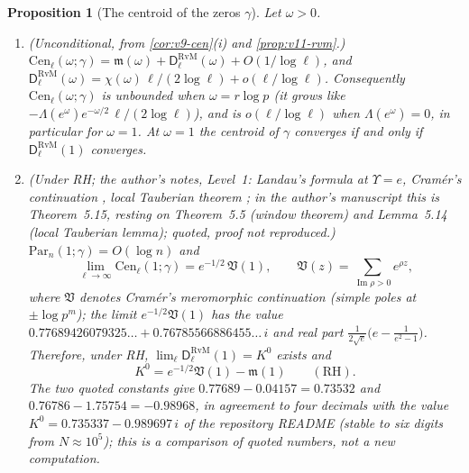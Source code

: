 \documentclass[11pt,a4paper]{article}
\numberwithin{equation}{section}
\newtheorem{proposition}[theorem]{Proposition}
\theoremstyle{definition}
\theoremstyle{remark}
\begin{document}
\begin{proposition}[The centroid of the zeros $\gamma$]\label{prop:v11-gamma}
Let $\omega>0$.
\begin{enumerate}[label=(\alph*),leftmargin=*]
\item \emph{(Unconditional, from \cref{cor:v9-cen}(i) and \cref{prop:v11-rvm}.)} $\mathrm{Cen}_\ell(\omega;\gamma)=\mathfrak m(\omega)+\mathsf D_\ell^{\mathrm{RvM}}(\omega)+O(1/\log\ell)$, and $\mathsf D_\ell^{\mathrm{RvM}}(\omega)=\chi(\omega)\,\ell/(2\log\ell)+o(\ell/\log\ell)$. Consequently $\mathrm{Cen}_\ell(\omega;\gamma)$ is unbounded when $\omega=r\log p$ (it grows like $-\Lambda(e^{\omega})e^{-\omega/2}\,\ell/(2\log\ell)$), and is $o(\ell/\log\ell)$ when $\Lambda(e^\omega)=0$, in particular for $\omega=1$. At $\omega=1$ the centroid of $\gamma$ converges if and only if $\mathsf D_\ell^{\mathrm{RvM}}(1)$ converges.
\item \emph{(Under RH; the author's notes, Level~1: Landau's formula at $\Upsilon=e$, Cram\'er's continuation \cite{Cramer1919}, local Tauberian theorem \cite{DebruyneVindas2019}; in the author's manuscript \cite{CasanaV26} this is Theorem~5.15, resting on Theorem~5.5 (window theorem) and Lemma~5.14 (local Tauberian lemma); quoted, proof not reproduced.)} $\mathrm{Par}_n(1;\gamma)=O(\log n)$ and
\begin{equation}
\lim_{\ell\to\infty}\mathrm{Cen}_\ell(1;\gamma)=e^{-1/2}\,\mathfrak V(1),\qquad \mathfrak V(z)=\sum_{\operatorname{Im}\rho>0}e^{\rho z},
\end{equation}
where $\mathfrak V$ denotes Cram\'er's meromorphic continuation (simple poles at $\pm\log p^m$); the limit $e^{-1/2}\mathfrak V(1)$ has the value $0.77689426079325\ldots+0.76785566886455\ldots\,i$ and real part $\frac1{2\sqrt e}\bigl(e-\frac1{e^2-1}\bigr)$. Therefore, under RH, $\lim_\ell\mathsf D_\ell^{\mathrm{RvM}}(1)=K^0$ exists and
\begin{equation}
K^0=e^{-1/2}\mathfrak V(1)-\mathfrak m(1)\qquad(\text{RH}).
\end{equation}
The two quoted constants give $0.77689-0.04157=0.73532$ and $0.76786-1.75754=-0.98968$, in agreement to four decimals with the value $K^0=0.735337-0.989697\,i$ of the repository README (stable to six digits from $N\approx10^5$); this is a comparison of quoted numbers, not a new computation.

\end{enumerate}
\end{proposition}
\end{document}
